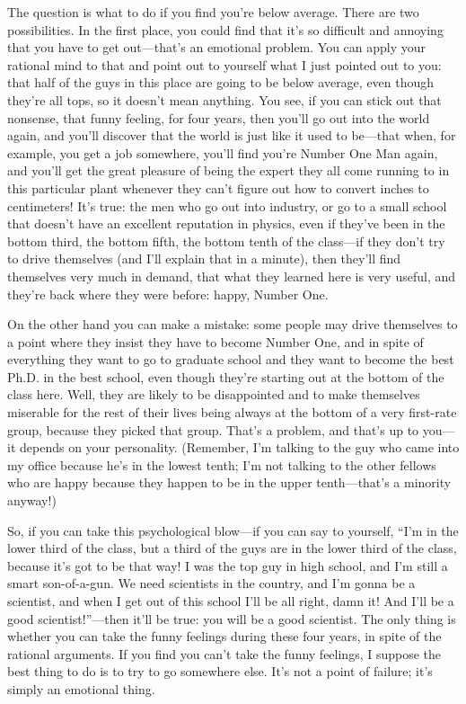\documentclass[11pt,oneside]{article}
\begin{document}
The question is what to do if you find you're below average. There are two possibilities. In the first place, you could find that it's so difficult and annoying that you have to get out---that's an emotional problem. You can apply your rational mind to that and point out to yourself what I just pointed out to you: that half of the guys in this place are going to be below average, even though they're all tops, so it doesn't mean anything. You see, if you can stick out that nonsense, that funny feeling, for four years, then you'll go out into the world again, and you'll discover that the world is just like it used to be---that when, for example, you get a job somewhere, you'll find you're Number One Man again, and you'll get the great pleasure of being the expert they all come running to in this particular plant whenever they can't figure out how to convert inches to centimeters! It's true: the men who go out into industry, or go to a small school that doesn't have an excellent reputation in physics, even if they've been in the bottom third, the bottom fifth, the bottom tenth of the class---if they don't try to drive themselves (and I'll explain that in a minute), then they'll find themselves very much in demand, that what they learned here is very useful, and they're back where they were before: happy, Number One.\par

On the other hand you can make a mistake: some people may drive themselves to a point where they insist they have to become Number One, and in spite of everything they want to go to graduate school and they want to become the best Ph.D. in the best school, even though they're starting out at the bottom of the class here. Well, they are likely to be disappointed and to make themselves miserable for the rest of their lives being always at the bottom of a very first-rate group, because they picked that group. That's a problem, and that's up to you---it depends on your personality. (Remember, I'm talking to the guy who came into my office because he's in the lowest tenth; I'm not talking to the other fellows who are happy because they happen to be in the upper tenth---that's a minority anyway!)\par

So, if you can take this psychological blow---if you can say to yourself, ``I'm in the lower third of the class, but a third of the guys are in the lower third of the class, because it's got to be that way! I was the top guy in high school, and I'm still a smart son-of-a-gun. We need scientists in the country, and I'm gonna be a scientist, and when I get out of this school I'll be all right, damn it! And I'll be a good scientist!''---then it'll be true: you will be a good scientist. The only thing is whether you can take the funny feelings during these four years, in spite of the rational arguments. If you find you can't take the funny feelings, I suppose the best thing to do is to try to go somewhere else. It's not a point of failure; it's simply an emotional thing.\par
\end{document}
